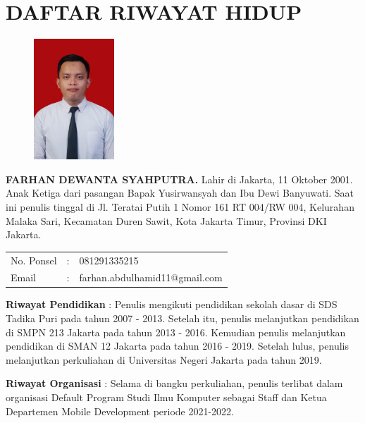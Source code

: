 
\pagestyle{empty}
\chapter*{\centering \large DAFTAR RIWAYAT HIDUP}
\thispagestyle{empty}
\onehalfspacing{}

\begin{figure}
	\vspace{-25pt}
	\begin{center}
		\includegraphics[width=0.27\textwidth]{gambar/pasfoto.JPG}
	\end{center}
	\vspace{-40pt}
\end{figure}

\noindent \textbf{FARHAN DEWANTA SYAHPUTRA.} Lahir di Jakarta, 11 Oktober 2001.
Anak Ketiga dari pasangan Bapak Yusirwansyah dan Ibu Dewi Banyuwati.
Saat ini penulis tinggal di Jl. Teratai Putih 1 Nomor 161 RT 004/RW 004, Kelurahan Malaka Sari,
Kecamatan Duren Sawit, Kota Jakarta Timur, Provinsi DKI Jakarta.

\vspace{1cm}
\noindent
\begin{tabular}{lcl}
	No. Ponsel	& :&  081291335215 \\
	Email	& :&  farhan.abdulhamid11@gmail.com
\end{tabular}
\vspace{0.5cm}

\noindent \textbf{Riwayat Pendidikan} : Penulis mengikuti pendidikan sekolah
dasar di SDS Tadika Puri pada tahun 2007 - 2013. Setelah itu,
penulis melanjutkan pendidikan di SMPN 213 Jakarta pada tahun
2013 - 2016. Kemudian penulis melanjutkan pendidikan di SMAN 12 Jakarta pada
tahun 2016 - 2019. Setelah lulus, penulis melanjutkan perkuliahan 
di Universitas Negeri Jakarta pada tahun 2019.

\noindent \textbf{Riwayat Organisasi} : Selama di bangku perkuliahan, penulis 
terlibat dalam organisasi Default Program Studi Ilmu Komputer 
sebagai Staff dan Ketua Departemen Mobile Development periode 2021-2022. 

